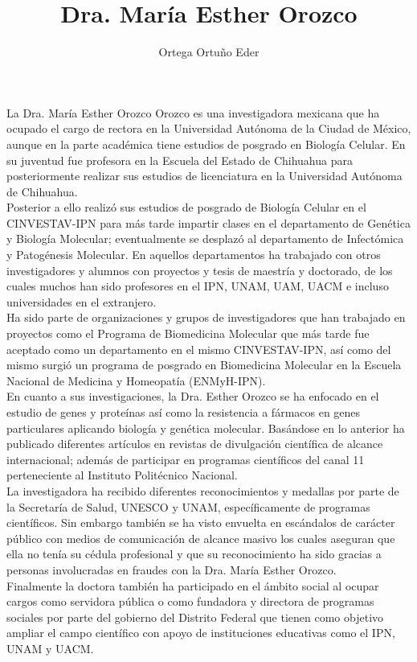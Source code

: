 \documentclass{article}
\title{Dra. María Esther Orozco}
\author{Ortega Ortu\~no Eder}
\date{} %
\begin{document}
	\maketitle
	\normalsize{
La Dra. María Esther Orozco Orozco es una investigadora mexicana que ha ocupado el cargo de rectora en la Universidad Autónoma de la Ciudad de México, aunque en la parte académica tiene estudios de posgrado en Biología Celular. En su juventud fue profesora en la Escuela del Estado de Chihuahua para posteriormente realizar sus estudios de licenciatura en la Universidad Autónoma de Chihuahua.
\\

Posterior a ello realizó sus estudios de posgrado de Biología Celular en el CINVESTAV-IPN para más tarde impartir clases en el departamento de Genética y Biología Molecular; eventualmente se desplazó al departamento de Infectómica y Patogénesis Molecular. En aquellos departamentos ha trabajado con otros investigadores y alumnos con proyectos y tesis de maestría y doctorado, de los cuales muchos han sido profesores en el IPN, UNAM, UAM, UACM e incluso universidades en el extranjero.
\\

Ha sido parte de organizaciones y grupos de investigadores que han trabajado en proyectos como el Programa de Biomedicina Molecular que más tarde fue aceptado como un departamento en el mismo CINVESTAV-IPN, así como del mismo surgió un programa de posgrado en Biomedicina Molecular en la Escuela Nacional de Medicina y Homeopatía (ENMyH-IPN).
\\

En cuanto a sus investigaciones, la Dra. Esther Orozco se ha enfocado en el estudio de genes y proteínas así como la resistencia a fármacos en genes particulares aplicando biología y genética molecular. Basándose en lo anterior ha publicado diferentes artículos en revistas de divulgación científica de alcance internacional; además de participar en programas científicos del canal 11 perteneciente al Instituto Politécnico Nacional.
\\

La investigadora ha recibido diferentes reconocimientos y medallas por parte de la Secretaría de Salud, UNESCO y UNAM, específicamente de programas científicos. Sin embargo también se ha visto envuelta en escándalos de carácter público con medios de comunicación de alcance masivo los cuales aseguran que ella no tenía su cédula profesional y que su reconocimiento ha sido gracias a personas involucradas en fraudes con la Dra. María Esther Orozco.
\\

Finalmente la doctora también ha participado en el ámbito social al ocupar cargos como servidora pública o como fundadora y directora de programas sociales por parte del gobierno del Distrito Federal que tienen como objetivo ampliar el campo científico con apoyo de instituciones educativas como el IPN, UNAM y UACM.
\\
}
\end{document}
